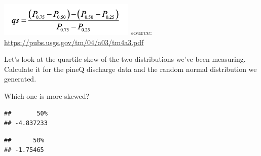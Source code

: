 \documentclass[
]{book}
\newenvironment{Shaded}{\begin{snugshade}}{\end{snugshade}}
\newcommand{\DecValTok}[1]{\textcolor[rgb]{0.00,0.00,0.81}{#1}}
\newcommand{\FunctionTok}[1]{\textcolor[rgb]{0.00,0.00,0.00}{#1}}
\newcommand{\NormalTok}[1]{#1}
\newcommand{\OtherTok}[1]{\textcolor[rgb]{0.56,0.35,0.01}{#1}}
\newcommand{\SpecialCharTok}[1]{\textcolor[rgb]{0.00,0.00,0.00}{#1}}
\begin{document}
\includegraphics{images/Screen Shot 2021-01-25 at 11.27.14 AM.png} source: \url{https://pubs.usgs.gov/tm/04/a03/tm4a3.pdf}

Let's look at the quartile skew of the two distributions we've been measuring. Calculate it for the pineQ discharge data and the random normal distribution we generated.

Which one is more skewed?

\begin{Shaded}
\end{Shaded}

\begin{verbatim}
##       50% 
## -4.837233
\end{verbatim}

\begin{Shaded}
\end{Shaded}

\begin{verbatim}
##      50% 
## -1.75465
\end{verbatim}
\end{document}
